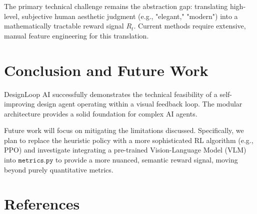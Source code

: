 \documentclass[11pt,a4paper]{article}
\begin{document}
The primary technical challenge remains the abstraction gap: translating high-level, subjective human aesthetic judgment (e.g., "elegant," "modern") into a mathematically tractable reward signal $R_t$. Current methods require extensive, manual feature engineering for this translation.

\section{Conclusion and Future Work}
DesignLoop AI successfully demonstrates the technical feasibility of a self-improving design agent operating within a visual feedback loop. The modular architecture provides a solid foundation for complex AI agents.

Future work will focus on mitigating the limitations discussed. Specifically, we plan to replace the heuristic policy with a more sophisticated RL algorithm (e.g., PPO) and investigate integrating a pre-trained Vision-Language Model (VLM) into $\texttt{metrics.py}$ to provide a more nuanced, semantic reward signal, moving beyond purely quantitative metrics.

\section*{References}


\end{document}
